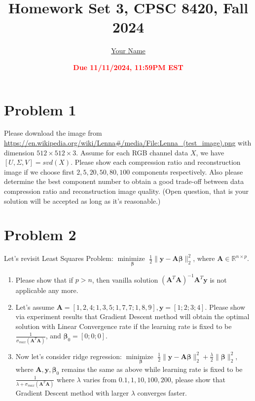 \documentclass[11pt]{article}
\title{{\bf Homework Set 3, CPSC 8420, Fall 2024}} %
\author{\Large\underline{Your Name}}
\date{\textbf{\Large\textcolor{red}{Due 11/11/2024, 11:59PM EST}}} %
\newcommand{\R}{\mathbb{R}}
\newcommand{\minimize}{\operatorname*{minimize\ }}
\newcommand{\mtx}[1]{\mathbf{#1}}
\newcommand{\vct}[1]{\mathbf{#1}}
\def \mA {\mtx{A}}
\def \vy {\vct{y}}
\def \R {\mathbb{R}}
\begin{document}
	\maketitle
	

\section*{Problem 1}
Please download the image from \url{https://en.wikipedia.org/wiki/Lenna#/media/File:Lenna_(test_image).png} with dimension $512\times512\times3$. Assume for each RGB channel data $X$, we have $[U,\Sigma,V]=svd(X)$. Please show each compression ratio and reconstruction image if we choose first $2, 5, 20, 50,80,100$ components respectively. Also please determine the best component number to obtain a good trade-off between data compression ratio and reconstruction image quality. (Open question, that is your solution will be accepted as long as it's reasonable.)
	
	
	
		\newpage
	\section*{Problem 2}
	Let's revisit Least Squares Problem: $\minimize \limits_{\bm{\beta}} \frac{1}{2}\|\vy-\mA\bm{\beta}\|^2_2$, where $\mA\in\R^{n\times p}$.
	\begin{enumerate}
		\item Please show that if $p>n$, then vanilla solution $(\mA^T\mA)^{-1}\mA^T\vy$ is not applicable any more.	
		\item Let's assume $\mA=[1, 2, 4;1, 3, 5; 1, 7, 7; 1, 8, 9], \vy=[1;2;3;4]$. Please show via experiment results that Gradient Descent method will obtain the optimal solution with  Linear Convergence rate if the learning rate is fixed to be $\frac{1}{\sigma_{max}(\mA^T\mA)}$, and $\bm{\beta}_0=[0;0;0]$.	
		\item Now let's consider ridge regression: $\minimize \limits_{\bm{\beta}} \frac{1}{2}\|\vy-\mA\bm{\beta}\|^2_2+\frac{\lambda}{2} \|\bm{\beta}\|^2_2$, where  $\mA,\vy,\bm{\beta}_0$ remains the same as above while learning rate is fixed to be $\frac{1}{\lambda+\sigma_{max}(\mA^T\mA)}$ where $\lambda$ varies from $0.1,1,10,100,200$, please show that Gradient Descent method with larger $\lambda$ converges faster. 
	\end{enumerate}
	\newpage
	
\end{document}
